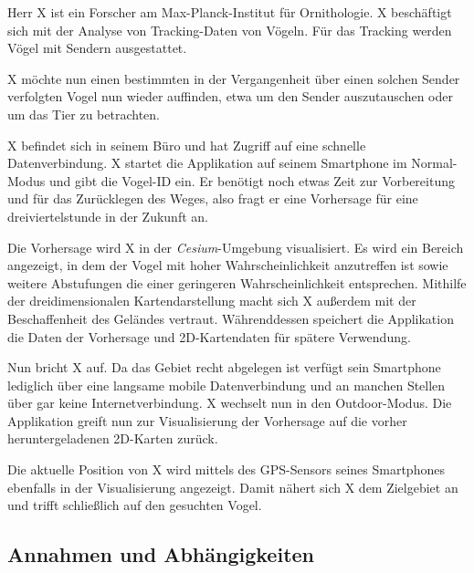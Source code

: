 \documentclass[12pt]{article} %
\begin{document}
\begin{displayquote}
\small
Herr X ist ein Forscher am Max-Planck-Institut für Ornithologie. X beschäftigt sich mit der Analyse von Tracking-Daten von Vögeln. Für das Tracking werden Vögel mit Sendern ausgestattet. 

X möchte nun einen bestimmten in der Vergangenheit über einen solchen Sender verfolgten Vogel nun wieder auffinden, etwa um den Sender auszutauschen oder um das Tier zu betrachten.

X befindet sich in seinem Büro und hat Zugriff auf eine schnelle Datenverbindung. X startet die Applikation auf seinem Smartphone im Normal-Modus und gibt die Vogel-ID ein. Er benötigt noch etwas Zeit zur Vorbereitung und für das Zurücklegen des Weges, also fragt er eine Vorhersage für eine dreiviertelstunde in der Zukunft an.

Die Vorhersage wird X in der \textit{Cesium}-Umgebung visualisiert. Es wird ein Bereich angezeigt, in dem der Vogel mit hoher Wahrscheinlichkeit anzutreffen ist sowie weitere Abstufungen die einer geringeren Wahrscheinlichkeit entsprechen. Mithilfe der dreidimensionalen Kartendarstellung macht sich X außerdem mit der Beschaffenheit des Geländes vertraut. Währenddessen speichert die Applikation die Daten der Vorhersage und 2D-Kartendaten für spätere Verwendung.

Nun bricht X auf. Da das Gebiet recht abgelegen ist verfügt sein Smartphone lediglich über eine langsame mobile Datenverbindung und an manchen Stellen über gar keine Internetverbindung. X wechselt nun in den Outdoor-Modus. Die Applikation greift nun zur Visualisierung der Vorhersage auf die vorher heruntergeladenen 2D-Karten zurück.

Die aktuelle Position von X wird mittels des GPS-Sensors seines Smartphones ebenfalls in der Visualisierung angezeigt. Damit nähert sich X dem Zielgebiet an und trifft schließlich auf den gesuchten Vogel.
\end{displayquote}


\subsection{Annahmen und Abhängigkeiten}

\end{document}

